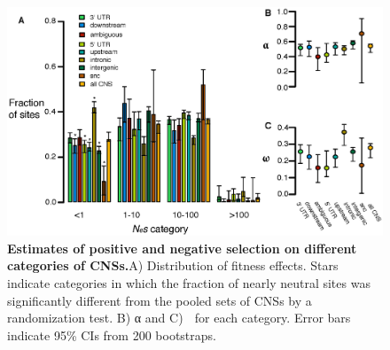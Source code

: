 \begin{figure}[h!]
      \centering
       \includegraphics[width=\linewidth]{Ch2FigS7}
    \caption{\textbf{Estimates of positive and negative selection on different categories of CNSs.}A) Distribution of fitness effects. Stars indicate categories in which the fraction of nearly neutral sites was significantly different from the pooled sets of CNSs by a randomization test. B) α and C)  for each category. Error bars indicate 95\% CIs from 200 bootstraps.}
    \label{fig:figS7}
\end{figure}

